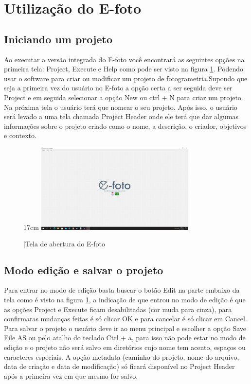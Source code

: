 \section{Utilização do E-foto}
\subsection{Iniciando um projeto}
Ao executar a versão integrada do E-foto você encontrará as seguintes opções na primeira tela: Project, Execute e Help como pode ser visto na figura \ref{fig:efoto1}. Podendo usar o software para criar ou modificar um projeto de fotogrametria.Supondo que seja a primeira vez do usuário no E-foto a opção certa a ser seguida deve ser Project e em seguida selecionar a opção New ou ctrl + N para criar um projeto. Na próxima tela o usuário terá que nomear o seu projeto. Após isso, o usuário será levado a uma tela chamada Project Header onde ele terá que dar algumas informações sobre o projeto criado como o nome, a descrição, o criador, objetivos e contexto.

\begin{figure}[!ht]{17cm}
	\includegraphics[width=8cm, center]{figuras/efoto1.jpg}
	\caption{|Tela de abertura do E-foto} \label{fig:efoto1}
\end{figure}

\subsection{Modo edição e salvar o projeto}
Para entrar no modo de edição basta buscar o botão Edit na parte embaixo da tela como é visto na figura \ref{fig:efoto1}, a indicação de que entrou no modo de edição é que as opções Project e Execute ficam desabilitadas (cor muda para cinza), para confirmaras mudanças feitas é só clicar OK e para cancelar é só clicar em Cancel.
Para salvar o projeto o usuário deve ir ao menu principal e escolher a opção Save File AS ou pelo atalho do teclado Ctrl + a, para isso não pode estar no modo de edição e o projeto não será salvo em diretórios cujo nome tem acento, espaços ou caracteres especiais.
A opção metadata (caminho do projeto, nome do arquivo, data de criação e data de modificação) só ficará disponível no Project Header após a primeira vez em que mesmo for salvo.

